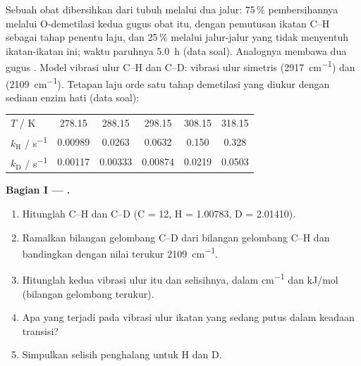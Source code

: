\begin{problem}
\label{pb:b3:rate-theories:1}
Sebuah obat dibersihkan dari tubuh melalui dua jalur: 75\,\% pembersihannya
melalui O-demetilasi kedua gugus  obat itu, dengan pemutusan ikatan C--H
sebagai tahap penentu laju, dan 25\,\% melalui jalur-jalur yang tidak
menyentuh ikatan-ikatan ini; waktu paruhnya \qty{5.0}{h} (data soal). Analognya
membawa dua gugus . Model vibrasi ulur C--H dan C--D: vibrasi ulur
simetris  (\qty{2917}{cm^{-1}}) dan  (\qty{2109}{cm^{-1}}).
Tetapan laju orde satu tahap demetilasi yang diukur dengan sediaan enzim hati
(data soal):
\begin{center}\small
\begin{tabular}{lccccc}
\hline
$T$ / K & 278.15 & 288.15 & 298.15 & 308.15 & 318.15 \\
$k_{\mathrm H}$ / \unit{s^{-1}} & 0.00989 & 0.0263 & 0.0632 & 0.150 & 0.328 \\
$k_{\mathrm D}$ / \unit{s^{-1}} & 0.00117 & 0.00333 & 0.00874 & 0.0219 & 0.0503 \\ \hline
\end{tabular}
\end{center}

\medskip\noindent\textbf{Bagian I --- .}
\begin{enumerate}[beginpenalty=10000]
  \item Hitunglah  C--H dan C--D (C = 12, H = 1.00783,
        D = 2.01410).
  \item Ramalkan bilangan gelombang C--D dari bilangan gelombang C--H dan
        bandingkan dengan nilai terukur \qty{2109}{cm^{-1}}.
  \item Hitunglah  kedua vibrasi ulur itu dan selisihnya,
        dalam \unit{cm^{-1}} dan \unit{kJ/mol} (bilangan gelombang terukur).
  \item Apa yang terjadi pada vibrasi ulur ikatan yang sedang putus dalam
        keadaan transisi?
  \item Simpulkan selisih penghalang untuk H dan D.
\end{enumerate}


\end{problem}
